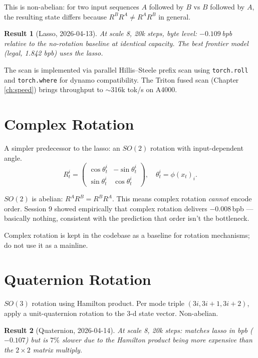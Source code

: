 \documentclass[11pt,openany]{book}
\theoremstyle{definition}
\theoremstyle{plain}
\newtheorem{result}{Result}[chapter]
\begin{document}
This is non-abelian: for two input sequences $A$ followed by $B$ vs $B$
followed by $A$, the resulting state differs because $R^B R^A \neq R^A
R^B$ in general.

\begin{result}[Lasso, 2026-04-13]
At scale 8, 20k steps, byte level: $-0.109$\,bpb relative to the
no-rotation baseline at identical capacity. The best frontier model
(legal, 1.842 bpb) uses the lasso.
\end{result}

The scan is implemented via parallel Hillis--Steele prefix scan using
\texttt{torch.roll} and \texttt{torch.where} for dynamo compatibility.
The Triton fused scan (Chapter \ref{ch:speed}) brings throughput to
$\sim$316k tok/s on A4000.

\section{Complex Rotation}

A simpler predecessor to the lasso: an $SO(2)$ rotation with input-dependent
angle.
\begin{equation}
  R_t^i = \begin{pmatrix}
    \cos\theta_t^i & -\sin\theta_t^i \\
    \sin\theta_t^i & \cos\theta_t^i
  \end{pmatrix},
  \quad \theta_t^i = \phi(x_t)_i.
\end{equation}

$SO(2)$ is abelian: $R^A R^B = R^B R^A$. This means complex rotation
\emph{cannot} encode order. Session 9 showed empirically that complex
rotation delivers $-0.008$\,bpb --- basically nothing, consistent with
the prediction that order isn't the bottleneck.

Complex rotation is kept in the codebase as a baseline for rotation
mechanisms; do not use it as a mainline.

\section{Quaternion Rotation}

$SO(3)$ rotation using Hamilton product. Per mode triple $(3i, 3i+1, 3i+2)$,
apply a unit-quaternion rotation to the 3-d state vector. Non-abelian.

\begin{result}[Quaternion, 2026-04-14]
At scale 8, 20k steps: matches lasso in bpb ($-0.107$) but is $7\%$ slower
due to the Hamilton product being more expensive than the $2\times 2$
matrix multiply.
\end{result}
\end{document}
